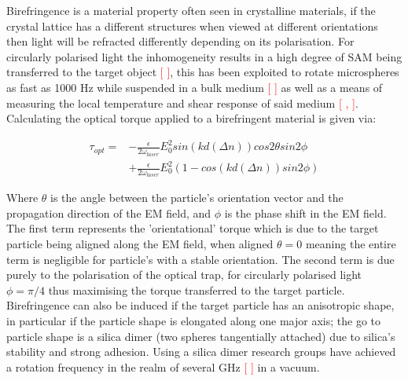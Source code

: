 Birefringence is a material property often seen in crystalline materials, if the crystal lattice has a different structures when viewed at different orientations then light will be refracted differently depending on its polarisation. For circularly polarised light the inhomogeneity results in a high degree of SAM being transferred to the target object \textcolor{red}{[ ]}, this has been exploited to rotate microspheres as fast as 1000 Hz while suspended in a bulk medium \textcolor{red}{[ ]} as well as a means of measuring the local temperature and shear response of said medium \textcolor{red}{[ , ]}. Calculating the optical torque applied to a birefringent material is given via:

\begin{equation}
	\label{eq:opt_torque}
	\begin{aligned}
		\tau_{opt} =& -\frac{\epsilon}{2\omega_{laser}}E_0^2sin(kd(\Delta n))cos2\theta sin2\phi \\ &+  \frac{\epsilon}{2\omega_{laser}}E_0^2 (1-cos(kd(\Delta n))sin2\phi)
	\end{aligned}
\end{equation}

Where $\theta$ is the angle between the particle's orientation vector and the propagation direction of the EM field, and $\phi$ is the phase shift in the EM field.  The first term represents the 'orientational' torque which is due to the target particle being aligned along the EM field, when aligned $\theta=0$ meaning the entire term is negligible for particle's with a stable orientation. The second term is due purely to the polarisation of the optical trap, for circularly polarised light $\phi=\pi/4$ thus maximising the torque transferred to the target particle. Birefringence can also be induced if the target particle has an anisotropic shape, in particular if the particle shape is elongated along one major axis; the go to particle shape is a silica dimer (two spheres tangentially attached) due to silica's stability and strong adhesion. Using a silica dimer research groups have achieved a rotation frequency in the realm of several GHz \textcolor{red}{[ ]} in a vacuum. 

